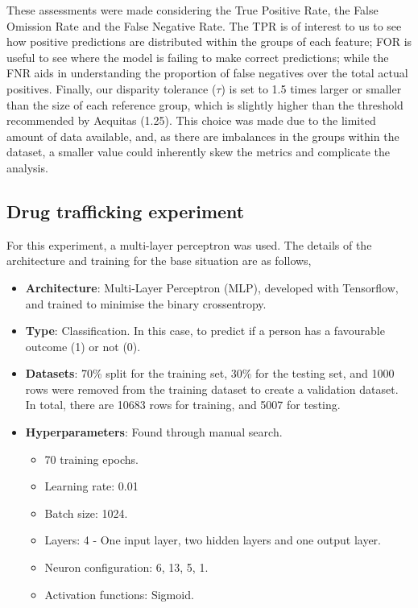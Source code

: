 \documentclass[fleqn,10pt]{wlscirep}
\begin{document}
These assessments were made considering the True Positive Rate, the False Omission Rate and the False Negative Rate. The TPR is of interest to us to see how positive predictions are distributed within the groups of each feature; FOR is useful to see where the model is failing to make correct predictions; while the FNR aids in understanding the proportion of false negatives over the total actual positives. Finally, our disparity tolerance ($\tau$) is set to 1.5 times larger or smaller than the size of each reference group, which is slightly higher than the threshold recommended by Aequitas (1.25). This choice was made due to the limited amount of data available, and, as there are imbalances in the groups within the dataset, a smaller value could inherently skew the metrics and complicate the analysis.

\subsection{Drug trafficking experiment}

For this experiment, a multi-layer perceptron was used. The details of the architecture and training for the base situation are as follows,

\begin{itemize}
        \item \textbf{Architecture}: Multi-Layer Perceptron (MLP), developed with Tensorflow, and trained to minimise the binary crossentropy.
        \item \textbf{Type}: Classification. In this case, to predict if a person has a favourable outcome (1) or not (0).
        \item \textbf{Datasets}: 70\% split for the training set, 30\% for the testing set, and 1000 rows were removed from the training dataset to create a validation dataset. In total, there are 10683 rows for training, and 5007 for testing.
        \item \textbf{Hyperparameters}: Found through manual search.
            \begin{itemize}
                \item 70 training epochs.
                \item Learning rate: 0.01
                \item Batch size: 1024.
                \item Layers: 4 - One input layer, two hidden layers and one output layer.
                \item Neuron configuration: 6, 13, 5, 1.
                \item Activation functions: Sigmoid.
            \end{itemize}
\end{itemize}
\end{document}

